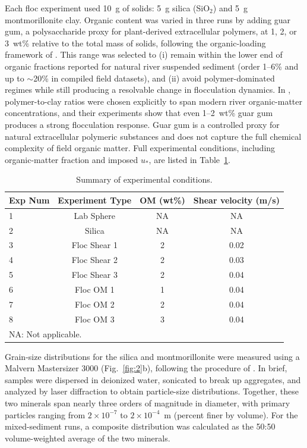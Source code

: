 \documentclass{agujournal2019}
\begin{document}
Each floc experiment used 10~g of solids: 5~g silica (SiO$_2$) and 5~g montmorillonite clay. Organic content was varied in three runs by adding guar gum, a polysaccharide proxy for plant-derived extracellular polymers, at 1, 2, or 3~wt\% relative to the total mass of solids, following the organic-loading framework of . This range was selected to (i) remain within the lower end of organic fractions reported for natural river suspended sediment (order 1–6\% and up to $\sim$20\% in compiled field datasets), and (ii) avoid polymer-dominated regimes while still producing a resolvable change in flocculation dynamics. In , polymer-to-clay ratios were chosen explicitly to span modern river organic-matter concentrations, and their experiments show that even 1–2~wt\% guar gum produces a strong flocculation response. Guar gum is a controlled proxy for natural extracellular polymeric substances and does not capture the full chemical complexity of field organic matter. Full experimental conditions, including organic-matter fraction and imposed $u_*$, are listed in Table~\ref{tab:exp_conditions}.

\begin{table}[htbp]
\caption{Summary of experimental conditions.\label{tab:exp_conditions}}
\centering
\begin{tabular}{lccc}
\hline
Exp Num & Experiment Type & OM (wt\%) & Shear velocity (m/s) \\
\hline
1 & Lab Sphere     & NA    & NA    \\
2 & Silica         & NA    & NA    \\
3 & Floc Shear 1   & 2     & 0.02  \\
4 & Floc Shear 2   & 2     & 0.03  \\
5 & Floc Shear 3   & 2     & 0.04  \\
6 & Floc OM 1     & 1     & 0.04  \\
7 & Floc OM 2     & 2     & 0.04  \\
8 & Floc OM 3     & 3     & 0.04  \\
\hline
\multicolumn{4}{l}{NA: Not applicable.}
\end{tabular}
\end{table}

Grain-size distributions for the silica and montmorillonite were measured using a Malvern Mastersizer 3000 (Fig.~\ref{fig:2}b), following the procedure of . In brief, samples were dispersed in deionized water, sonicated to break up aggregates, and analyzed by laser diffraction to obtain particle-size distributions. Together, these two minerals span nearly three orders of magnitude in diameter, with primary particles ranging from $2 \times 10^{-7}$ to $2 \times 10^{-4}$~m (percent finer by volume). For the mixed-sediment runs, a composite distribution was calculated as the 50:50 volume-weighted average of the two minerals.
\end{document}
